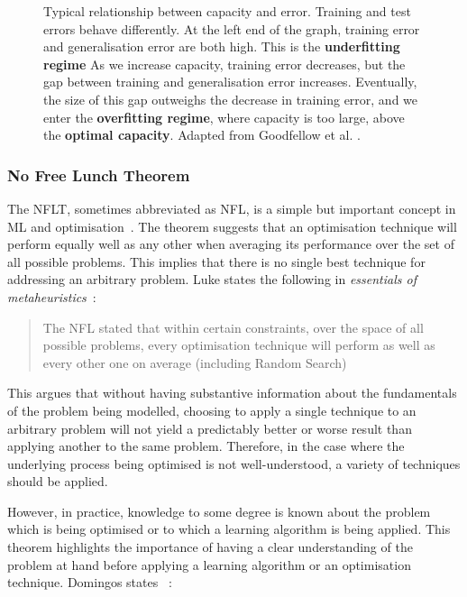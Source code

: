 \begin{figure}[htp]
    \centering
    
    \captionsetup{format=hang} %
    \caption{
        Typical relationship between capacity and error. Training and test errors behave differently. At the left end of the graph, training error and generalisation error are both high. This is the \textbf{underfitting regime} As we increase capacity, training error decreases, but the gap between training and generalisation error increases. Eventually, the size of this gap outweighs the decrease in training error, and we enter the \textbf{overfitting regime}, where capacity is too large, above the \textbf{optimal capacity}. Adapted from Goodfellow et al. \cite{Goodfellow-et-al-2016}. 
        }
    \label{fig:capacity}
\end{figure}

\subsubsection{No Free Lunch Theorem}

The \gls{NFLT}, sometimes abbreviated as \gls{NFL}, is a simple but important concept in \gls{ML} and optimisation~\cite{Wolpert1997}. The theorem suggests that an optimisation technique will perform equally well as any other when averaging its performance over the set of all possible problems. This implies that there is no single best technique for addressing an arbitrary problem. Luke states the following in \textit{essentials of metaheuristics}~\cite{luke2012essentials}:

\begin{quote}
    The \gls{NFL} stated that within certain constraints, over the space of all possible problems, every optimisation technique will perform as well as every other one on average (including Random Search)
\end{quote}

This argues that without having substantive information about the fundamentals of the problem being modelled, choosing to apply a single technique to an arbitrary problem will not yield a predictably better or worse result than applying another to the same problem. Therefore, in the case where the underlying process being optimised is not well-understood, a variety of techniques should be applied.

However, in practice, knowledge to some degree is known about the problem which is being optimised or to which a learning algorithm is being applied. This theorem highlights the importance of having a clear understanding of the problem at hand before applying a learning algorithm or an optimisation technique. Domingos states ~\cite{Domingos15}:

